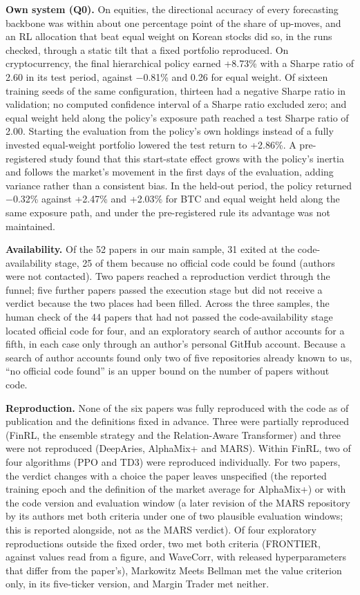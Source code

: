 \documentclass[12pt,a4paper]{report}
\begin{document}
\textbf{Own system (Q0).} On equities, the directional accuracy of every
forecasting backbone was within about one percentage point of the share
of up-moves, and an RL allocation that beat equal weight on Korean
stocks did so, in the runs checked, through a static tilt that a fixed
portfolio reproduced. On cryptocurrency, the final hierarchical policy
earned +8.73\% with a Sharpe ratio of 2.60 in its test period, against
−0.81\% and 0.26 for equal weight. Of sixteen training seeds of the same
configuration, thirteen had a negative Sharpe ratio in validation; no
computed confidence interval of a Sharpe ratio excluded zero; and equal
weight held along the policy's exposure path reached a test Sharpe ratio
of 2.00. Starting the evaluation from the policy's own holdings instead
of a fully invested equal-weight portfolio lowered the test return to
+2.86\%. A pre-registered study found that this start-state effect grows
with the policy's inertia and follows the market's movement in the first
days of the evaluation, adding variance rather than a consistent bias.
In the held-out period, the policy returned −0.32\% against +2.47\% and
+2.03\% for BTC and equal weight held along the same exposure path, and
under the pre-registered rule its advantage was not maintained.

\textbf{Availability.} Of the 52 papers in our main sample, 31 exited at
the code-availability stage, 25 of them because no official code could
be found (authors were not contacted). Two papers reached a reproduction
verdict through the funnel; five further papers passed the execution
stage but did not receive a verdict because the two places had been
filled. Across the three samples, the human check of the 44 papers that
had not passed the code-availability stage located official code for
four, and an exploratory search of author accounts for a fifth, in each
case only through an author's personal GitHub account. Because a search
of author accounts found only two of five repositories already known to
us, ``no official code found'' is an upper bound on the number of papers
without code.

\textbf{Reproduction.} None of the six papers was fully reproduced with
the code as of publication and the definitions fixed in advance. Three
were partially reproduced (FinRL, the ensemble strategy and the
Relation-Aware Transformer) and three were not reproduced (DeepAries,
AlphaMix+ and MARS). Within FinRL, two of four algorithms (PPO and TD3)
were reproduced individually. For two papers, the verdict changes with a
choice the paper leaves unspecified (the reported training epoch and the
definition of the market average for AlphaMix+) or with the code version
and evaluation window (a later revision of the MARS repository by its
authors met both criteria under one of two plausible evaluation windows;
this is reported alongside, not as the MARS verdict). Of four
exploratory reproductions outside the fixed order, two met both criteria
(FRONTIER, against values read from a figure, and WaveCorr, with
released hyperparameters that differ from the paper's), Markowitz Meets
Bellman met the value criterion only, in its five-ticker version, and
Margin Trader met neither.
\end{document}
